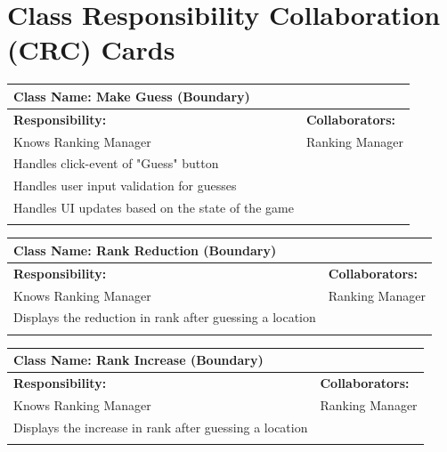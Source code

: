 \documentclass[]{article}
\begin{document}
	
\section{Class Responsibility Collaboration (CRC) Cards}
\label{sec:class_responsibility_collaboration_crc_cards}

	\begin{table}[H]
		\centering
		\begin{tabular}{|p{8cm}|p{8cm}|}
		\hline 
		 \multicolumn{2}{|l|}{\textbf{Class Name:} Make Guess (Boundary)} \\
		\hline
		\textbf{Responsibility:} & \textbf{Collaborators:} \\
		\hline
		Knows Ranking Manager & Ranking Manager \\
		Handles click-event of "Guess" button & \\
		Handles user input validation for guesses & \\
		Handles UI updates based on the state of the game & \\
		\vspace{1in} & \\
		\hline
		\end{tabular}
	\end{table}
	
	\begin{table}[H]
		\centering
		\begin{tabular}{|p{8cm}|p{8cm}|}
		\hline 
		 \multicolumn{2}{|l|}{\textbf{Class Name:} Rank Reduction (Boundary)} \\
		\hline
		\textbf{Responsibility:} & \textbf{Collaborators:} \\
		\hline
		Knows Ranking Manager & Ranking Manager \\
		Displays the reduction in rank after guessing a location & \\
		\vspace{1in} & \\
		\hline
		\end{tabular}
	\end{table}

	\begin{table}[H]
		\centering
		\begin{tabular}{|p{8cm}|p{8cm}|}
		\hline 
		 \multicolumn{2}{|l|}{\textbf{Class Name:} Rank Increase (Boundary)} \\
		\hline
		\textbf{Responsibility:} & \textbf{Collaborators:} \\
		\hline
		Knows Ranking Manager & Ranking Manager \\
		Displays the increase in rank after guessing a location & \\
		\vspace{1in} & \\
		\hline
		\end{tabular}
	\end{table}
\end{document}
